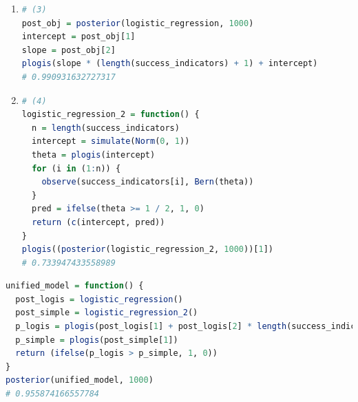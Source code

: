 \documentclass{article}
\begin{document}
\begin{enumerate}
\item 
\begin{lstlisting}[language=R]
# (3)
post_obj = posterior(logistic_regression, 1000)
intercept = post_obj[1]
slope = post_obj[2]
plogis(slope * (length(success_indicators) + 1) + intercept)
# 0.990931632727317
\end{lstlisting}



\item 
\begin{lstlisting}[language=R]
# (4)
logistic_regression_2 = function() {
  n = length(success_indicators)
  intercept = simulate(Norm(0, 1))
  theta = plogis(intercept)
  for (i in (1:n)) {
    observe(success_indicators[i], Bern(theta))
  }
  pred = ifelse(theta >= 1 / 2, 1, 0)
  return (c(intercept, pred))
}
plogis((posterior(logistic_regression_2, 1000))[1])
# 0.733947433558989
\end{lstlisting}





\end{enumerate}


\begin{lstlisting}[language=R]
unified_model = function() {
  post_logis = logistic_regression()
  post_simple = logistic_regression_2()
  p_logis = plogis(post_logis[1] + post_logis[2] * length(success_indicators))
  p_simple = plogis(post_simple[1])
  return (ifelse(p_logis > p_simple, 1, 0))
}
posterior(unified_model, 1000)
# 0.955874166557784
\end{lstlisting}










 
\end{document}
